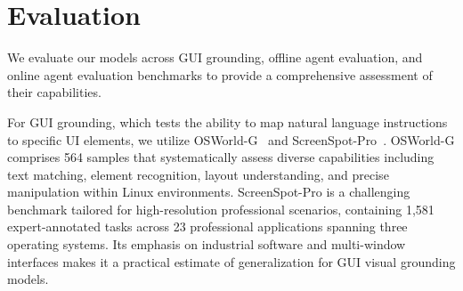 \documentclass{llmxive}
\begin{document}
\section{Evaluation}
\label{sec: agent evaluation}
We evaluate our models across GUI grounding, offline agent evaluation, and online agent evaluation benchmarks to provide a comprehensive assessment of their capabilities.

For GUI grounding, which tests the ability to map natural language instructions to specific UI elements, we utilize OSWorld-G~\citep{xie2025scaling} and ScreenSpot-Pro~\citep{li2025screenspot}. OSWorld-G comprises 564 samples that systematically assess diverse capabilities including text matching, element recognition, layout understanding, and precise manipulation within Linux environments. ScreenSpot-Pro is a challenging benchmark tailored for high-resolution professional scenarios, containing 1,581 expert-annotated tasks across 23 professional applications spanning three operating systems. Its emphasis on industrial software and multi-window interfaces makes it a practical estimate of generalization for GUI visual grounding models.
\end{document}

